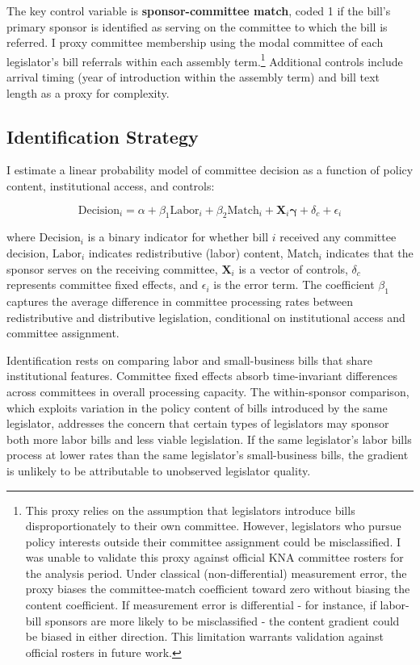 \documentclass[11pt]{article}
\begin{document}
The key control variable is \textbf{sponsor-committee match}, coded 1 if the bill's primary sponsor is identified as serving on the committee to which the bill is referred. I proxy committee membership using the modal committee of each legislator's bill referrals within each assembly term.\footnote{This proxy relies on the assumption that legislators introduce bills disproportionately to their own committee. However, legislators who pursue policy interests outside their committee assignment could be misclassified. I was unable to validate this proxy against official KNA committee rosters for the analysis period. Under classical (non-differential) measurement error, the proxy biases the committee-match coefficient toward zero without biasing the content coefficient. If measurement error is differential - for instance, if labor-bill sponsors are more likely to be misclassified - the content gradient could be biased in either direction. This limitation warrants validation against official rosters in future work.} Additional controls include arrival timing (year of introduction within the assembly term) and bill text length as a proxy for complexity.

\subsection{Identification Strategy}
\label{sec:ident}

I estimate a linear probability model of committee decision as a function of policy content, institutional access, and controls:

\begin{equation}
\text{Decision}_i = \alpha + \beta_1 \text{Labor}_i + \beta_2 \text{Match}_i + \mathbf{X}_i \boldsymbol{\gamma} + \delta_c + \epsilon_i
\label{eq:main}
\end{equation}

\noindent where $\text{Decision}_i$ is a binary indicator for whether bill $i$ received any committee decision, $\text{Labor}_i$ indicates redistributive (labor) content, $\text{Match}_i$ indicates that the sponsor serves on the receiving committee, $\mathbf{X}_i$ is a vector of controls, $\delta_c$ represents committee fixed effects, and $\epsilon_i$ is the error term. The coefficient $\beta_1$ captures the average difference in committee processing rates between redistributive and distributive legislation, conditional on institutional access and committee assignment.

Identification rests on comparing labor and small-business bills that share institutional features. Committee fixed effects absorb time-invariant differences across committees in overall processing capacity. The within-sponsor comparison, which exploits variation in the policy content of bills introduced by the same legislator, addresses the concern that certain types of legislators may sponsor both more labor bills and less viable legislation. If the same legislator's labor bills process at lower rates than the same legislator's small-business bills, the gradient is unlikely to be attributable to unobserved legislator quality.
\end{document}
